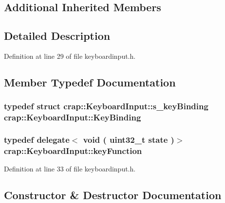 \subsection*{Additional Inherited Members}


\subsection{Detailed Description}


Definition at line 29 of file keyboardinput.\+h.



\subsection{Member Typedef Documentation}
\hypertarget{classcrap_1_1_keyboard_input_aded4eebea0fea50b5244242f241c384c}{}
\subsubsection[{Key\+Binding}]{\setlength{\rightskip}{0pt plus 5cm}typedef struct {\bf crap\+::\+Keyboard\+Input\+::s\+\_\+key\+Binding}
	 {\bf crap\+::\+Keyboard\+Input\+::\+Key\+Binding}}\label{classcrap_1_1_keyboard_input_aded4eebea0fea50b5244242f241c384c}
\hypertarget{classcrap_1_1_keyboard_input_a65627167afa075a37fa85b21b5e9fb0b}{}
\subsubsection[{key\+Function}]{\setlength{\rightskip}{0pt plus 5cm}typedef {\bf delegate}$<$ void ( uint32\+\_\+t state )$>$ {\bf crap\+::\+Keyboard\+Input\+::key\+Function}}\label{classcrap_1_1_keyboard_input_a65627167afa075a37fa85b21b5e9fb0b}


Definition at line 33 of file keyboardinput.\+h.



\subsection{Constructor \& Destructor Documentation}
\hypertarget{classcrap_1_1_keyboard_input_aee4763d39526518f64d931c6c7a2fc7a}{}
